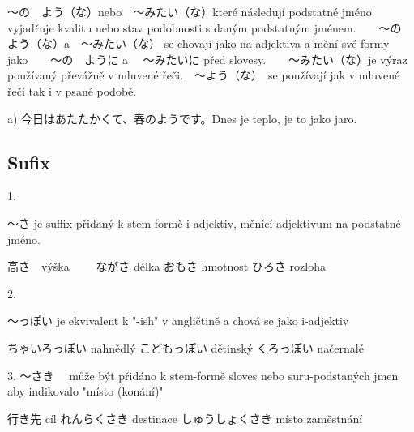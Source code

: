〜の　よう（な）nebo　〜みたい（な）které následují podstatné jméno vyjadřuje kvalitu nebo stav podobnosti s daným podstatným jménem.　　〜の　よう（な）a　〜みたい（な） se chovají jako na-adjektiva a mění své formy jako　　〜の　ように a 　〜みたいに před slovesy.　　〜みたい（な）je výraz používaný převážně v mluvené řeči.　〜よう（な）　se používají jak v mluvené řeči tak i v psané podobě.

a) 今日はあたたかくて、春のようです。Dnes je teplo, je to jako jaro.

\subsection{Sufix}
1. 

〜さ je suffix přidaný k stem formě i-adjektiv, měnící adjektivum na podstatné jméno. 

高さ　výška　　
ながさ délka
おもさ hmotnost
ひろさ rozloha

2.

〜っぽい je ekvivalent k "-ish" v angličtině a chová se jako i-adjektiv

ちゃいろっぽい nahnědlý 
こどもっぽい dětinský
くろっぽい načernalé

3. 〜さき　 může být přidáno k stem-formě sloves nebo suru-podstaných jmen aby indikovalo "místo (konání)"

行き先 cíl
れんらくさき destinace
しゅうしょくさき místo zaměstnání

